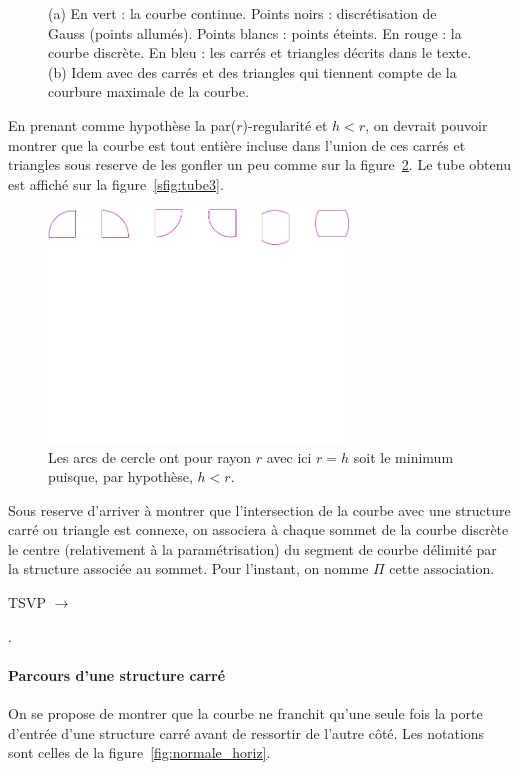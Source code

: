 \documentclass{report}
\begin{document}
\begin{figure}[!h]
  \caption{\label{fig:tube}(a) En vert : la courbe continue. Points noirs : discrétisation de Gauss (points allumés). Points blancs : points éteints. En rouge : la courbe discrète. En bleu : les carrés et triangles décrits dans le texte.
  (b) Idem avec des \og carrés\fg{} et des \og triangles\fg{} qui tiennent compte de la courbure maximale de la courbe.}
\end{figure}


En prenant comme hypothèse la par($r$)-regularité et $h<r$, on devrait pouvoir montrer que la courbe est tout entière incluse dans l'union de ces carrés et triangles sous reserve de les gonfler un peu comme sur la figure~\ref{fig:carres_triangles}. Le \og tube\fg{} obtenu est affiché sur la figure~\ref{sfig:tube3}.
\begin{figure}[h!]
  \centering
  \includegraphics[width=8cm,clip=true,trim=0 210 0 0]{tube3-1}
    \caption{\label{fig:carres_triangles}Les arcs de cercle ont pour rayon $r$ avec ici $r=h$ soit le minimum puisque, par hypothèse, $h<r$.}
    \end{figure}

    Sous reserve d'arriver à montrer que l'intersection de la courbe avec une structure carré ou triangle est connexe, on associera à chaque sommet de la courbe discrète le centre (relativement à la paramétrisation) du segment de courbe délimité par la structure associée au sommet. Pour l'instant, on nomme $\Pi$ cette association.

    \bigskip
    
    \hfill TSVP $\to$

    \newpage. 
    \paragraph{Parcours d'une structure carré}
    On se propose de montrer que la courbe ne franchit qu'une seule fois la \og porte d'entrée\fg{} d'une structure carré avant de ressortir de l'autre côté.
    Les notations sont celles de la figure~\ref{fig:normale_horiz}.
\end{document}
